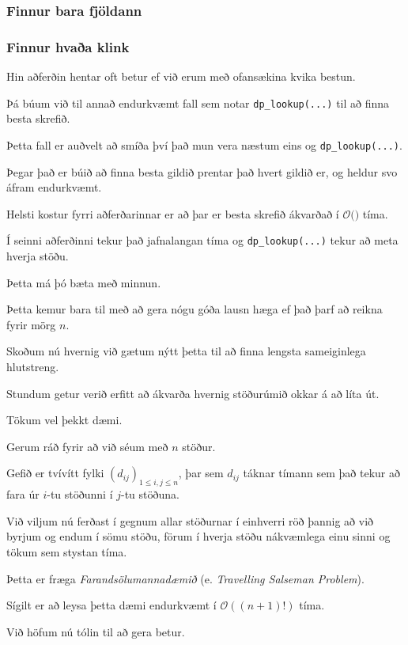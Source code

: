{
	\frametitle{Finnur bara fjöldann}
}

{
	\frametitle{Finnur hvaða klink}
}

{
	{
		\item<1-> Hin aðferðin hentar oft betur ef við erum með ofansækina kvika bestun.
		\item<2-> Þá búum við til annað endurkvæmt fall sem notar \texttt{dp\_lookup(...)} til að finna besta skrefið.
		\item<3-> Þetta fall er auðvelt að smíða því það mun vera næstum eins og \texttt{dp\_lookup(...)}.
		\item<4-> Þegar það er búið að finna besta gildið prentar það hvert gildið er, og heldur svo áfram endurkvæmt.
	}
}

{
}

{
	{
		\item<1-> Helsti kostur fyrri aðferðarinnar er að þar er besta skrefið ákvarðað í $\mathcal{O}($$)$ tíma.
		\item<3-> Í seinni aðferðinni tekur það jafnalangan tíma og \texttt{dp\_lookup(...)} tekur að meta hverja stöðu.
		\item<4-> Þetta má þó bæta með minnun.
		\item<5-> Þetta kemur bara til með að gera nógu góða lausn hæga ef það þarf að reikna fyrir mörg $n$.
		\item<6-> Skoðum nú hvernig við gætum nýtt þetta til að finna lengsta sameiginlega hlutstreng.
	}
}

{
}

{
	{
		\item<1-> Stundum getur verið erfitt að ákvarða hvernig stöðurúmið okkar á að líta út.
		\item<2-> Tökum vel þekkt dæmi.
		\item<3-> Gerum ráð fyrir að við séum með $n$ stöður.
		\item<4-> Gefið er tvívítt fylki $(d_{ij})_{1 \leq i, j \leq n}$,
					þar sem $d_{ij}$ táknar tímann sem það tekur að fara úr $i$-tu stöðunni í $j$-tu stöðuna.
		\item<5-> Við viljum nú ferðast í gegnum allar stöðurnar í einhverri röð þannig að við	
					byrjum og endum í sömu stöðu, förum í hverja stöðu nákvæmlega einu sinni og tökum sem stystan tíma.
		\item<6-> Þetta er fræga \emph{Farandsölumannadæmið} (e. \emph{Travelling Salseman Problem}).
		\item<7-> Sígilt er að leysa þetta dæmi endurkvæmt í $\mathcal{O}((n + 1)!)$ tíma.
		\item<8-> Við höfum nú tólin til að gera betur.
	}
}

